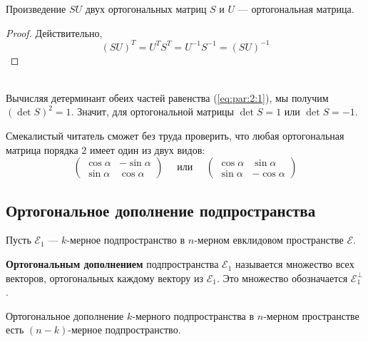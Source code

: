 \documentclass[11pt]{article}
\begin{document}
\begin{lemma}
    Произведение $SU$ двух ортогональных матриц $S$ и $U$ --- ортогональная матрица.
\end{lemma}

\begin{proof}
    Действительно,
    \[(SU)^T = U^T S^T = U^{-1} S^{-1} = (SU)^{-1}\]
\end{proof} \leavevmode
\\
Вычисляя детерминант обеих частей равенства (\ref{eq:par:2:1}), мы получим $(\det S)^2 = 1$. Значит, для ортогональной матрицы $\det S = 1$ или $\det S = -1$.

\begin{remark}
    Смекалистый читатель сможет без труда проверить, что любая ортогональная матрица порядка $2$ имеет один из двух видов:
    \begin{equation*}
        \begin{pmatrix}
            \cos \alpha & - \sin \alpha \\
            \sin \alpha & \cos \alpha
        \end{pmatrix}
        \quad 
        \text{ или }
        \quad
        \begin{pmatrix}
            \cos \alpha & \sin \alpha \\
            \sin \alpha & - \cos \alpha
        \end{pmatrix}
    \end{equation*} 
\end{remark}

\subsection{Ортогональное дополнение подпространства}

Пусть $\mathcal{E}_1$ --- $k$-мерное подпространство в $n$-мерном евклидовом пространстве $\mathcal{E}$.

\begin{definition}
    \textbf{Ортогональным дополнением} подпространства $\mathcal{E}_1$ называется множество всех векторов, ортогональных каждому вектору из $\mathcal{E}_1$. Это множество обозначается $\mathcal{E}_1^{\perp}$.
\end{definition}

\begin{theorem}
    Ортогональное дополнение $k$-мерного подпространства в $n$-мерном пространстве есть $(n - k)$-мерное подпространство.
\end{theorem}
\end{document}
